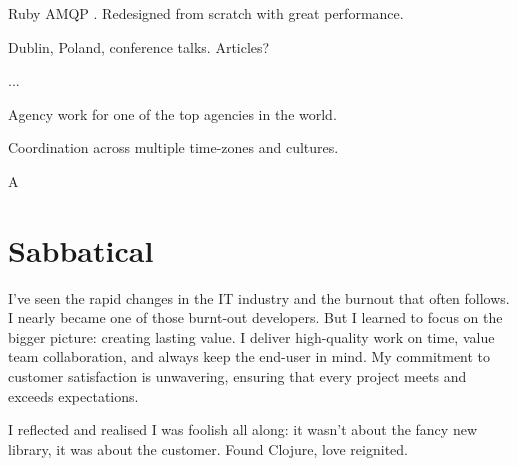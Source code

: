 \startitemize
  \item Ruby AMQP . Redesigned from scratch with great performance.
  \item Dublin, Poland, conference talks. Articles?
  \item ...
\stopitemize


\startitemize
  \item Agency work for one of the top agencies in the world.
  \item Coordination across multiple time-zones and cultures.
\stopitemize

\startitemize
  \item A
\stopitemize

\section{Sabbatical}
I’ve seen the rapid changes in the IT industry and the burnout that often follows. I nearly became one of those burnt-out developers. But I learned to focus on the bigger picture: creating lasting value. I deliver high-quality work on time, value team collaboration, and always keep the end-user in mind. My commitment to customer satisfaction is unwavering, ensuring that every project meets and exceeds expectations.

I reflected and realised I was foolish all along: it wasn't about the fancy new library, it was about the customer. Found Clojure, love reignited.


